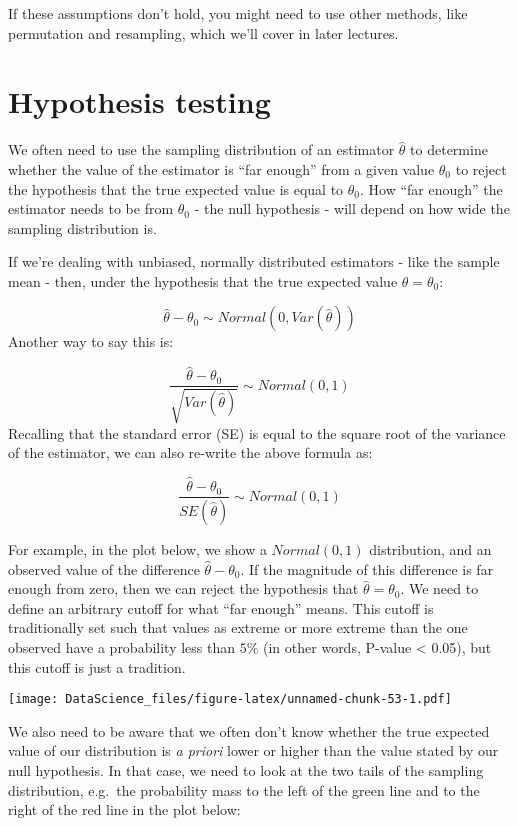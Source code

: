 \documentclass[
]{book}
\begin{document}
If these assumptions don't hold, you might need to use other methods, like permutation and resampling, which we'll cover in later lectures.

\hypertarget{hypothesis-testing}{%
\section{Hypothesis testing}\label{hypothesis-testing}}

We often need to use the sampling distribution of an estimator \(\hat{\theta}\) to determine whether the value of the estimator is ``far enough'' from a given value \(\theta_0\) to reject the hypothesis that the true expected value is equal to \(\theta_0\). How ``far enough'' the estimator needs to be from \(\theta_0\) - the null hypothesis - will depend on how wide the sampling distribution is.

If we're dealing with unbiased, normally distributed estimators - like the sample mean - then, under the hypothesis that the true expected value \(\theta = \theta_0\):

\[\hat{\theta} - \theta_0 \sim Normal(0, Var(\hat{\theta}))\]
Another way to say this is:

\[\frac{\hat{\theta} - \theta_0}{\sqrt{Var(\hat{\theta})}} \sim Normal(0, 1)\]
Recalling that the standard error (SE) is equal to the square root of the variance of the estimator, we can also re-write the above formula as:

\[\frac{\hat{\theta} - \theta_0}{SE(\hat{\theta})} \sim Normal(0, 1)\]

For example, in the plot below, we show a \(Normal(0,1)\) distribution, and an observed value of the difference \(\hat{\theta}-\theta_0\). If the magnitude of this difference is far enough from zero, then we can reject the hypothesis that \(\hat{\theta} = \theta_0\). We need to define an arbitrary cutoff for what ``far enough'' means. This cutoff is traditionally set such that values as extreme or more extreme than the one observed have a probability less than \(5\%\) (in other words, P-value \textless{} 0.05), but this cutoff is just a tradition.

\texttt{[image: DataScience\_files/figure-latex/unnamed-chunk-53-1.pdf]}

We also need to be aware that we often don't know whether the true expected value of our distribution is \emph{a priori} lower or higher than the value stated by our null hypothesis. In that case, we need to look at the two tails of the sampling distribution, e.g.~the probability mass to the left of the green line and to the right of the red line in the plot below:
\end{document}
